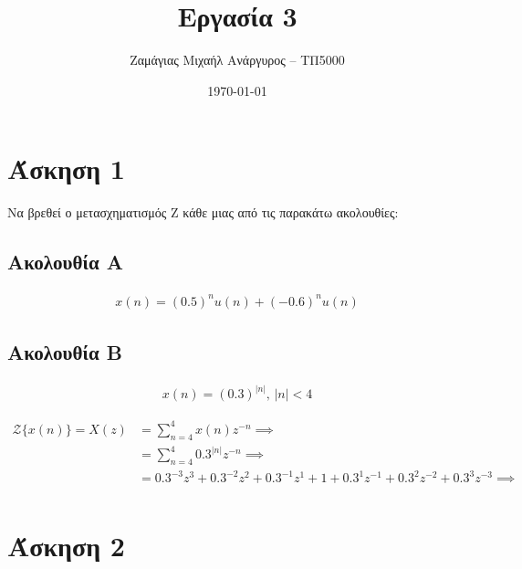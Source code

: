 \documentclass[12pt]{turabian-researchpaper}
\title{Εργασία 3}
\author{Ζαμάγιας Μιχαήλ Ανάργυρος -- ΤΠ5000}
\date{\today}
\begin{document}
\begin{titlepage}
    \maketitle
\end{titlepage}

\tableofcontents

\newpage\section{Άσκηση 1}
Να βρεθεί ο μετασχηματισμός Ζ κάθε μιας από τις παρακάτω ακολουθίες:
\subsection{Ακολουθία A}
\begin{equation*}
    \begin{aligned}
        x(n) = (0.5)^n u(n) + (-0.6)^n u(n)
    \end{aligned}
\end{equation*}

\subsection{Ακολουθία B}
\begin{equation*}
    \begin{aligned}
        x(n) = (0.3)^{| n |} \text{, } | n | < 4
    \end{aligned}
\end{equation*}

\begin{equation*}
    \begin{aligned}
        \mathcal{Z}\{ x(n) \} = X(z) & = \sum_{n = 4}^{ 4 } x(n)z^{-n} \implies                                                                           \\
                                     & = \sum_{n = 4}^{ 4 } 0.3^{|n|} z^{-n} \implies                                                                     \\
                                     & = 0.3^{-3} z^{3} + 0.3^{-2} z^{2} + 0.3^{-1} z^{1} + 1 + 0.3^{1} z^{-1} + 0.3^{2} z^{-2} + 0.3^{3} z^{-3} \implies \\
    \end{aligned}
\end{equation*}


\newpage\section{Άσκηση 2}
\end{document}
